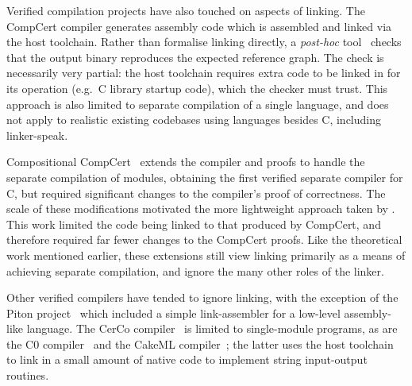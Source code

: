 \documentclass[preprint,10pt]{sigplanconf-pldi16}
\begin{document}
Verified compilation projects have also touched on aspects of linking.
The CompCert compiler generates assembly code which is assembled and linked via the host toolchain. Rather than formalise linking directly, a \textit{post-hoc} tool~\cite[Section 7]{compcert-manual} checks that the output binary reproduces the expected reference graph.
The check is necessarily very partial: the host toolchain requires extra code to be linked in for its operation (e.g.\ C library startup code), which the checker must trust.
This approach is also limited to separate compilation of a single language, and does not apply to realistic existing codebases using languages besides C, including linker-speak.

Compositional CompCert~\cite{stewart-compositional-2015} extends the compiler and proofs to handle the separate compilation of modules, obtaining the first verified separate compiler for C, but required significant changes to the compiler's proof of correctness.
The scale of these modifications motivated the more lightweight approach taken by \citet{kang-lightweight-2015}.
This work limited the code being linked to that produced by CompCert, and therefore required far fewer changes to the CompCert proofs.
Like the theoretical work mentioned earlier, these extensions still view linking primarily as a means of achieving separate compilation, and ignore the many other roles of the linker.

Other verified compilers have tended to ignore linking, with the exception of the Piton project~\cite{moore-piton-1996} which included a simple link-assembler for a low-level assembly-like language.
The CerCo compiler~\cite{amadio-certified-2014} is limited to
single-module programs, as are the C0
compiler~\cite{petrova-verification-2007} and the CakeML
compiler~\cite{kumar-cake-2014}; the latter uses the host toolchain to link in a small amount of native code to implement string input-output routines.
\end{document}
